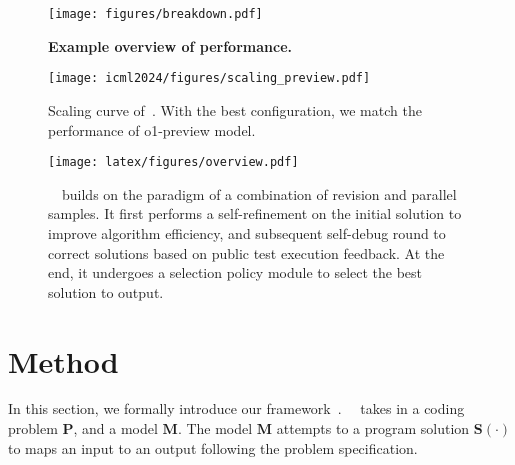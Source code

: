 \begin{figure}[!t]
    \centering
    \texttt{[image: figures/breakdown.pdf]}      \caption{\textbf{Example overview of performance.}}
        \label{fig:breakdown}
\end{figure}

\begin{figure*}
    \centering
    \texttt{[image: icml2024/figures/scaling\_preview.pdf]}
\caption{Scaling curve of~\frameworkname. With the best configuration, we match the performance of o1-preview model. }
\label{fig:scaling_preview}
\end{figure*}

\begin{figure}[th!]
    \centering
    \texttt{[image: latex/figures/overview.pdf]}
\caption{~\frameworkname~builds on the paradigm of a combination of revision and parallel samples.  It first performs a self-refinement on the initial solution to improve algorithm efficiency, and subsequent self-debug round to correct solutions based on public test execution feedback. At the end, it undergoes a selection policy module to select the best solution to output.
}
\label{fig:Design}
\end{figure}

\section{Method}
\label{sec:method}
In this section, we formally introduce our framework~\frameworkname. ~\frameworkname~takes in a coding problem $\mathbf{P}$, and a model $\mathbf{M}$. The model $\mathbf{M}$ attempts to a program solution $\mathbf{S(\cdot)}$ to maps an input to an output following the problem specification.

